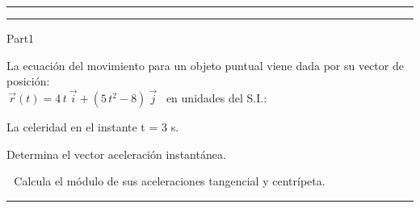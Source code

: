 \documentclass[10pt]{article}
\begin{document}
\vspace*{-2.7cm}
\noindent\rule{1.05\textwidth}{0,4pt}
\noindent{} 
\vspace{-0,35cm}
\noindent{}\vspace{0,65cm}
\noindent {}\vspace{-0,25cm}
\noindent\rule{1.05\textwidth}{0,4pt}
\vspace*{-1.5cm}

\makeatletter
\renewcommand{\eqleftmargin}[2]{\makebox[0pt][r]{\marginpointtext{#1}{#2}%
    \setlength{\@tempdima}{\eqemargin}%
    \hspace*{\@tempdima}}}
\makeatother
\lhead{}
\chead{}
\rhead{}

\begin{exam}{Part1}
\forceNoColor
\useFillerDefault
\fillTypeDots
{}
\eqWLSpacing{18pt}
\vspace*{1cm}\begin{problem*}[\auto]La ecuación del movimiento para un objeto puntual viene dada por su vector de posición:\\  \,$\vec{r}(t)=4\,t \ \vec{i} + (5\,t^2 -8)\ \vec{j}$ \, en unidades del S.I.:
\begin{parts}
\item {} La celeridad en el instante t = 3 s.
\item Determina el vector aceleración instantánea.
\item \,  \,Calcula el módulo de sus aceleraciones tangencial y centrípeta.
\end{parts}
 \begin{solution}
\phantom{}
\end{solution}
\end{problem*}\vfill
\hrule
\vspace*{0.2cm}
\end{exam} 
\end{document}

